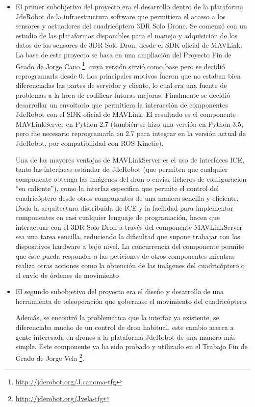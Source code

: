 \begin{itemize}
\item El primer subobjetivo del proyecto era el desarrollo dentro de la plataforma JdeRobot de la infraestructura software que permitiera el acceso a los sensores y actuadores del cuadricóptero 3DR Solo Drone. Se comenzó con un estudio de las plataformas disponibles para el manejo y adquisición de los datos de los sensores de 3DR Solo Dron, desde el SDK oficial de MAVLink. La base de este proyecto se basa en una ampliación del Proyecto Fin de Grado de Jorge Cano \footnote{\url{http://jderobot.org/J.canoma-tfg}}, cuya versión sirvió como base pero se decidió reprogramarla desde 0. Los principales motivos fueron que no estaban bien diferenciadas las partes de servidor y cliente, lo cual era una fuente de problemas a la hora de codificar futuras mejoras. Finalmente se decidió desarrollar un envoltorio que permitiera la interacción de componentes JdeRobot con el SDK oficial de MAVLink. El resultado es el componente MAVLinkServer en Python 2.7 (también se hizo una versión en Python 3.5, pero fue necesario reprogramarla en 2.7 para integrar en la versión actual de JdeRobot, por compatibilidad con ROS Kinetic).

Una de las mayores ventajas de MAVLinkServer es el uso de interfaces ICE, tanto las interfaces estándar de JdeRobot (que permiten que cualquier componente obtenga las imágenes del dron o enviar ficheros de configuración “en caliente”), como la interfaz especifica que permite el control del cuadricóptero desde otros componentes de una manera sencilla y eficiente. Dada la arquitectura
distribuida de ICE y la facilidad para implementar componentes en casi cualquier lenguaje de programación, hacen que interactuar con el 3DR Solo Dron a través del componente MAVLinkServer sea una tarea sencilla, reduciendo la dificultad que supone trabajar con los dispositivos hardware a bajo nivel. La concurrencia del componente permite que éste pueda responder a las peticiones de otros componentes mientras realiza otras acciones como la obtención de las imágenes del cuadricóptero o el envío de órdenes de movimiento
\item El segundo subobjetivo del proyecto era el diseño y desarrollo de una herramienta de teleoperación que gobernase el movimiento del cuadricóptero.

Además, se encontró la problemática que la interfaz ya existente, se diferenciaba mucho de un control de dron habitual, este cambio acerca a gente interesada en drones a la plataforma JdeRobot de una manera más simple. Este componente ya ha sido probado y utilizado en el Trabajo Fin de Grado de Jorge Vela \footnote{\url{http://jderobot.org/Jvela-tfg}}\cite{jvelaTFG}.


\end{itemize}
